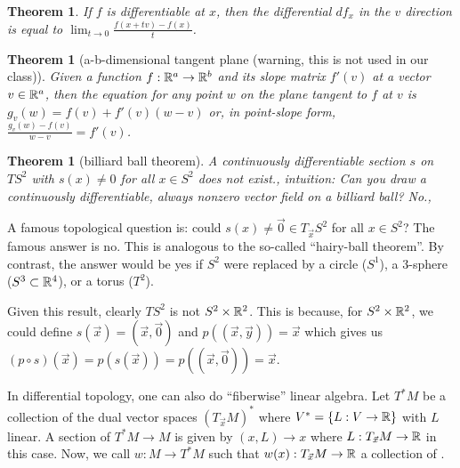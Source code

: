 \documentclass[11pt]{amsbook}
\theoremstyle{mystyle} \newtheorem{thrm}[thm]{Theorem}
\theoremstyle{mystyle} \newtheorem{defi}[thm]{Definition}
\theoremstyle{mystyle} \newtheorem{coro}[thm]{Corollary}
\theoremstyle{mystyle} \newtheorem{propo}[thm]{Proposition}
\theoremstyle{mystyle} \newtheorem{lemm}[thm]{Lemma}
\numberwithin{thm}{section}
\begin{document}
\begin{thrm}
	If $f$ is differentiable at $x$, then the differential $df_x$ in the $v$ direction is equal to $\lim_{t \to 0} \frac{f(x+tv) - f(x)}{t}$.
\end{thrm}


\begin{thrm}[a-b-dimensional tangent plane (warning, this is not used in our class)]
	Given a function $f : {\mathbb R}^a \to {\mathbb R}^b$ and its slope matrix $f'(v)$ at a vector $v \in {\mathbb R}^a$, then the equation for any point $w$ on the plane tangent to $f$ at $v$ is $g_v(w) = f(v) + f'(v)(w-v)$ or, in point-slope form, $\frac{g_v(w)-f(v)}{w-v} = f'(v)$.
\end{thrm}

\begin{thrm}[billiard ball theorem]
	A continuously differentiable section $s$ on $TS^2$ with $s(x) \neq 0$ for all $x \in S^2$ does not exist.,
	intuition: Can you draw a continuously differentiable, always nonzero vector field on a billiard ball?  No.,
\end{thrm}

A famous topological question is: could $s(x) \neq \vec{0} \in T_{\vec{x}}S^2$
for all $x \in S^2$? The famous answer is no. This is analogous to the
so-called ``hairy-ball theorem''. By contrast, the answer would be yes if $S^2$
were replaced by a circle ($S^1$), a 3-sphere ($S^3 \subset {\mathbb R}^4$), or a torus
($T^2$).

Given this result, clearly $TS^2$ is not $S^2 \times {\mathbb R}^2$. This is because,
for $S^2 \times {\mathbb R}^2$, we could define $s(\vec{x}) = (\vec{x}, \vec{0})$ and
$p( (\vec{x},\vec{y}) ) = \vec{x}$ which gives us $(p \circ s)(\vec{x}) =
p(s(\vec{x})) = p( (\vec{x}, \vec{0}) )= \vec{x}$.


In differential topology, one can also do ``fiberwise'' linear algebra. Let
$T^*M$ be a collection of the dual vector spaces $(T_{\vec{x}}M)^*$ where $V^* =
\{L: V \to {\mathbb R}\}$ with $L$ linear. A section of $T^*M \to M$ is given by $(x,L)
\to x$ where $L: T_{\vec{x}}M \to {\mathbb R}$ in this case. Now, we call $w: M \to
T^*M$ such that $w(x): T_{\vec{x}}M \to {\mathbb R}$ a collection of .
\end{document}
